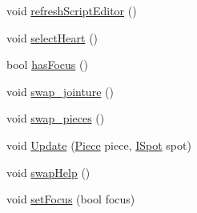 \begin{DoxyCompactItemize}
\item 
void \hyperlink{classgearit_1_1src_1_1_g_u_i_1_1_menu_robot_editor_ac98ed82a6bccb9c7deb2c9b645cba9a3}{refresh\+Script\+Editor} ()
\item 
void \hyperlink{classgearit_1_1src_1_1_g_u_i_1_1_menu_robot_editor_ad9271fd9c7498c776a25d6ce32b33d85}{select\+Heart} ()
\item 
bool \hyperlink{classgearit_1_1src_1_1_g_u_i_1_1_menu_robot_editor_a409d08034c3cae82a8e8ab0bcbc6ff63}{has\+Focus} ()
\item 
void \hyperlink{classgearit_1_1src_1_1_g_u_i_1_1_menu_robot_editor_a8686c70ba40895fb36528ac81486d479}{swap\+\_\+jointure} ()
\item 
void \hyperlink{classgearit_1_1src_1_1_g_u_i_1_1_menu_robot_editor_ad72993bb65e8a055bab043f997a22ff6}{swap\+\_\+pieces} ()
\item 
void \hyperlink{classgearit_1_1src_1_1_g_u_i_1_1_menu_robot_editor_a64d32c6114ccfe40ccfa53933480fd2a}{Update} (\hyperlink{classgearit_1_1src_1_1robot_1_1_piece}{Piece} piece, \hyperlink{interfacegearit_1_1src_1_1robot_1_1_i_spot}{I\+Spot} spot)
\item 
void \hyperlink{classgearit_1_1src_1_1_g_u_i_1_1_menu_robot_editor_ae3f5d7559311c781924fe9ec1109dd83}{swap\+Help} ()
\item 
void \hyperlink{classgearit_1_1src_1_1_g_u_i_1_1_menu_robot_editor_af52d0167dd80969841124fac05d6a5d1}{set\+Focus} (bool focus)
\end{DoxyCompactItemize}
